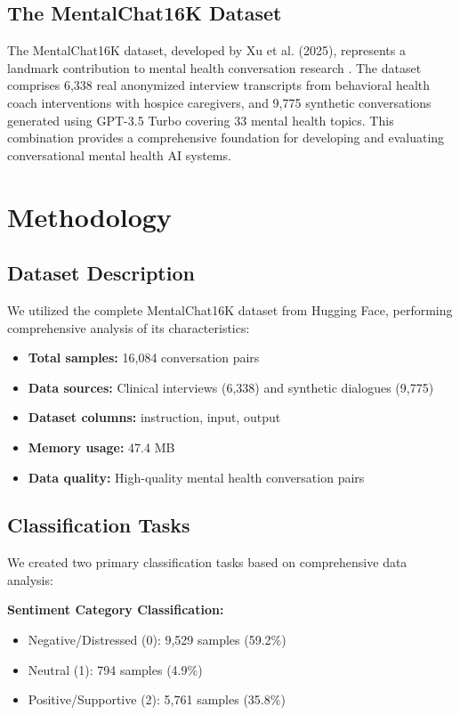 \documentclass[11pt,twocolumn]{article}
\begin{document}
\subsection{The MentalChat16K Dataset}

The MentalChat16K dataset, developed by Xu et al. (2025), represents a landmark contribution to mental health conversation research \cite{xu2025mentalchat16k}. The dataset comprises 6,338 real anonymized interview transcripts from behavioral health coach interventions with hospice caregivers, and 9,775 synthetic conversations generated using GPT-3.5 Turbo covering 33 mental health topics. This combination provides a comprehensive foundation for developing and evaluating conversational mental health AI systems.

\section{Methodology}

\subsection{Dataset Description}

We utilized the complete MentalChat16K dataset from Hugging Face, performing comprehensive analysis of its characteristics:

\begin{itemize}
\item \textbf{Total samples:} 16,084 conversation pairs
\item \textbf{Data sources:} Clinical interviews (6,338) and synthetic dialogues (9,775)
\item \textbf{Dataset columns:} instruction, input, output
\item \textbf{Memory usage:} 47.4 MB
\item \textbf{Data quality:} High-quality mental health conversation pairs
\end{itemize}

\subsection{Classification Tasks}

We created two primary classification tasks based on comprehensive data analysis:

\textbf{Sentiment Category Classification:}
\begin{itemize}
\item Negative/Distressed (0): 9,529 samples (59.2\%)
\item Neutral (1): 794 samples (4.9\%)
\item Positive/Supportive (2): 5,761 samples (35.8\%)
\end{itemize}
\end{document}

